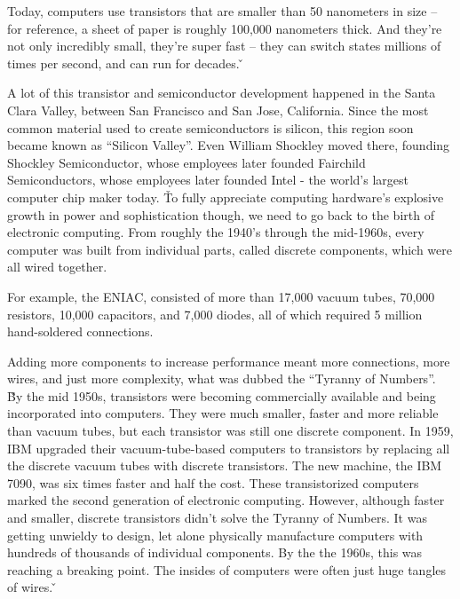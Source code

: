
Today, computers use transistors that are smaller than 50 nanometers in size – for reference, a sheet of paper is
roughly 100,000 nanometers thick. And they're not only incredibly small, they're super fast – they can switch states
millions of times per second, and can run for decades. \v


A lot of this transistor and semiconductor development happened in the Santa Clara Valley, between San Francisco and
San Jose, California. Since the most common material used to create semiconductors is silicon, this region soon
became known as ``Silicon Valley''. Even William Shockley moved there, founding Shockley Semiconductor, whose
employees later founded Fairchild Semiconductors, whose employees later founded Intel - the world's largest computer
chip maker today. \v

To fully appreciate computing hardware's explosive growth in power and sophistication though, we need to go back to
the birth of electronic computing. From roughly the 1940's through the mid-1960s, every computer was built from
individual parts, called discrete components, which were all wired together.

\be
For example, the ENIAC, consisted of more than 17,000 vacuum tubes, 70,000 resistors, 10,000 capacitors, and 7,000
diodes, all of which required 5 million hand-soldered connections.
\ee

Adding more components to increase performance meant more connections, more wires, and just more complexity, what was
dubbed the ``Tyranny of Numbers''. \v

By the mid 1950s, transistors were becoming commercially available and being incorporated into computers. They were
much smaller, faster and more reliable than vacuum tubes, but each transistor was still one discrete component. In
1959, IBM upgraded their vacuum-tube-based computers to transistors by replacing all the discrete vacuum tubes with
discrete transistors. The new machine, the IBM 7090, was six times faster and half the cost. These transistorized
computers marked the second generation of electronic computing. However, although faster and smaller, discrete
transistors didn't solve the Tyranny of Numbers. It was getting unwieldy to design, let alone physically manufacture
computers with hundreds of thousands of individual components. By the the 1960s, this was reaching a breaking point.
The insides of computers were often just huge tangles of wires. \v

